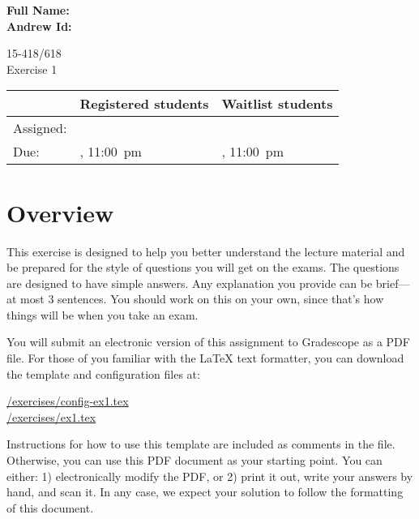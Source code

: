 \documentclass[11pt]{article}
\newcommand{\cref}[2]{\href{#1}{\color{blue}#2}}
\begin{document}
\begin{flushright}
{\large\bf Full Name: \makebox[2in][l]{

}} \\[1ex]

{\large\bf Andrew Id: \makebox[2in][l]{\tt

}} \\[1ex]
\end{flushright}
\vspace*{0.3in}
\begin{center}
\LARGE
15-418/618 \thisterm{} \\
Exercise 1
\\ 
\end{center}

\begin{center}
\Large
\begin{tabular}{lll}
\hline
 & Registered students & Waitlist students \\
\hline
Assigned: & \dateassigned{} & \dateassigned{} \\
Due: &  \datedueregistered{}, 11:00~pm & \dateduewaitlist{}, 11:00~pm \\
\hline
\end{tabular}
\end{center}

\section*{Overview}

This exercise is designed to help you better understand the lecture
material and be prepared for the style of questions you will get on
the exams.  The questions are designed to have simple answers.  Any
explanation you provide can be brief---at most 3 sentences.
You should work on this on your own, since that's how things will be when
you take an exam.

You will submit an electronic version of this assignment to Gradescope as
a PDF file.  For those of you familiar with the \LaTeX{} text formatter, you can download the template and configuration files at:
\begin{center}
  \cref{\actualcoursehome/exercises/config-ex1.tex}{\visiblecoursehome/exercises/config-ex1.tex}\\
  \cref{\actualcoursehome/exercises/ex1.tex}{\visiblecoursehome/exercises/ex1.tex}
\end{center}
Instructions for how to use this template are included as comments in the file.  Otherwise,
you can use this PDF document as your starting point.
You can either: 1) electronically modify the PDF, or 2) print it
out, write your answers by hand, and scan it.  In any case, we expect
your solution to follow the formatting of this document.
\end{document}

